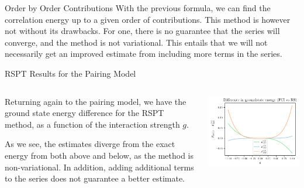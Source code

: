 \documentclass[UKenglish,aspectratio=169]{beamer}
\begin{document}
\begin{frame}{Order by Order Contributions}
    With the previous formula, we can find the correlation energy up to a given order of contributions.
    This method is however not without its drawbacks.
    For one, there is no guarantee that the series will converge, and the method is not variational.
    This entails that we will not necessarily get an improved estimate from including more terms in the series.
\end{frame}

\begin{frame}{RSPT Results for the Pairing Model}
    \begin{columns}
        \begin{column}{.49\textwidth}
            Returning again to the pairing model, we have the ground state energy difference for the RSPT method, as a function of the interaction strength $g$.

            \medskip

            As we see, the estimates diverge from the exact energy from both above and below, as the method is non-variational.
            In addition, adding additional terms to the series does not guarantee a better estimate.
        \end{column}

        \begin{column}{.49\textwidth}
            \includegraphics[width=\textwidth]{../midterm2/figures/rs_diff.pdf}
        \end{column}
    \end{columns}

\end{frame}
\end{document}
